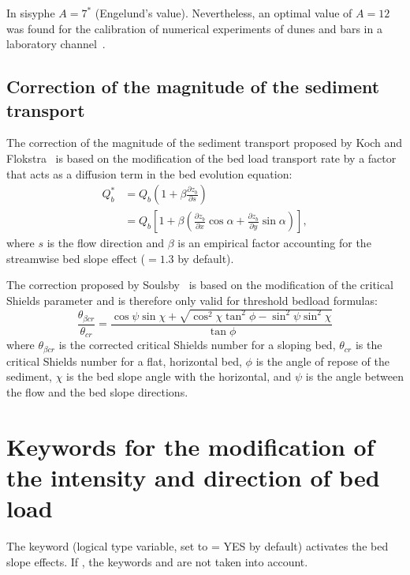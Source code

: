 In sisyphe{} $A=7^*$ (Engelund's value). Nevertheless, an optimal value of $A=12$ was found for the calibration of numerical experiments of dunes and bars in a laboratory channel~\cite{Mendoza15}.

\subsection{Correction of the magnitude of the sediment transport}
The correction of the magnitude of the sediment transport proposed by Koch and Flokstra~\cite{KochFlokstra80} is based on the modification of the bed load transport rate by a factor that acts as a diffusion term in the bed evolution equation:
\begin{equation}
\begin{array}{ll} \displaystyle
Q_b^* &= Q_{b}\left(1+\beta\frac{\partial z_b}{\partial s}\right) \\
    &= Q_{b}\left[1 + \beta \left(\frac{\partial z_b}{\partial x} \cos\alpha + \frac{\partial z_b}{\partial y} \sin\alpha\right)\right],
\end{array}
\end{equation}
where $s$ is the flow direction and $\beta$ is an empirical factor accounting for the streamwise bed slope effect ($=1.3$ by default).

The correction proposed by Soulsby~\cite{Soulsby97} is based on the modification of the critical Shields parameter and is therefore only valid for threshold bedload formulas:
\begin{equation*}
\frac{\theta_{\beta cr}}{\theta_{cr}} = \frac{\cos\psi \sin\chi + 
\sqrt{\cos^2\chi \tan^2\phi - \sin^2\psi \sin^2\chi}}{\tan
\phi}
\end{equation*}
where $\theta_{\beta cr}$ is the corrected critical Shields number for a sloping bed, $\theta_{cr}$ is the critical Shields number for a flat, horizontal bed, $\phi$ is the angle of repose of the sediment, $\chi$ is the bed slope angle with the horizontal, and $\psi$ is the angle between the flow and the bed slope directions.

\section{Keywords for the modification of the intensity and direction of bed load}
The keyword  (logical type variable, set to {\ttfamily = YES} by default) activates the bed slope effects. If , the keywords  and  are not taken into account.

